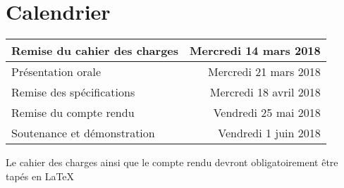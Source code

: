 \documentclass[11pt]{article}
\begin{document}
\section{Calendrier}

\begin{tabular}{|l|r|}
  \hline
  Remise du cahier des charges & Mercredi 14 mars 2018 \\
  \hline
  Présentation orale & Mercredi 21 mars 2018 \\
  \hline
  Remise des spécifications & Mercredi 18 avril 2018 \\ 
  \hline
  Remise du compte rendu & Vendredi 25 mai 2018 \\
  \hline
  Soutenance et démonstration & Vendredi 1 juin 2018 \\
  \hline
\end{tabular}

\vspace{1\baselineskip}

Le cahier des charges ainsi que le compte rendu devront obligatoirement être
tapés en \LaTeX
\end{document}
